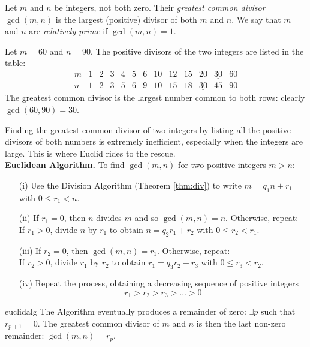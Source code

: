 \begin{defn}{}{}
Let $m$ and $n$ be integers, not both zero. Their \emph{greatest common divisor} $\gcd(m,n)$ is the largest (positive) divisor of both $m$ and $n$. We say that $m$ and $n$ are \emph{relatively prime} if $\gcd(m,n)=1$.
\end{defn}

\begin{example}{}{}
Let $m=60$ and $n=90$. The positive divisors of the two integers are listed in the table:
\[\begin{array}{c|cccccccccccc}
m&1&2&3&4&5&6&10&12&15&20&\underline{30}&60\\\hline
n&1&2&3&5&6&9&10&15&18&\underline{30}&45&90
\end{array}\]
The greatest common divisor is the largest number common to both rows: clearly $\gcd(60,90)=30$.
\end{example}

Finding the greatest common divisor of two integers by listing all the positive divisors of both numbers is extremely inefficient, especially when the integers are large. This is where Euclid rides to the rescue.\\

{\bf Euclidean Algorithm.} To find $\gcd(m,n)$ for two positive integers $m>n$:

\begin{itemize}
\item[(i)] Use the Division Algorithm (Theorem \ref{thm:div}) to write $m=q_1n+r_1$ with $0\le r_1<n$.
\item[(ii)] If $r_1=0$, then $n$ divides $m$ and so $\gcd(m,n)=n$. Otherwise, repeat:\\
	If $r_1>0$, divide $n$ by $r_1$ to obtain $n=q_2r_1+r_2$ with $0\le r_2<r_1$.
\item[(iii)] If $r_2=0$, then $\gcd(m,n)=r_1$. Otherwise, repeat:\\
	If $r_2>0$, divide $r_1$ by $r_2$ to obtain $r_1=q_3r_2+r_3$ with $0\le r_3<r_2$.
\item[(iv)] Repeat the process, obtaining a decreasing sequence of positive integers
\[r_1>r_2>r_3>\ldots>0\]
\end{itemize}


\begin{thm}{}{euclidalg}
The Algorithm eventually produces a remainder of zero: $\exists p$ such that $r_{p+1}=0$. The greatest common divisor of $m$ and $n$ is then the last non-zero remainder: $\gcd(m,n)=r_p$.
\end{thm}

